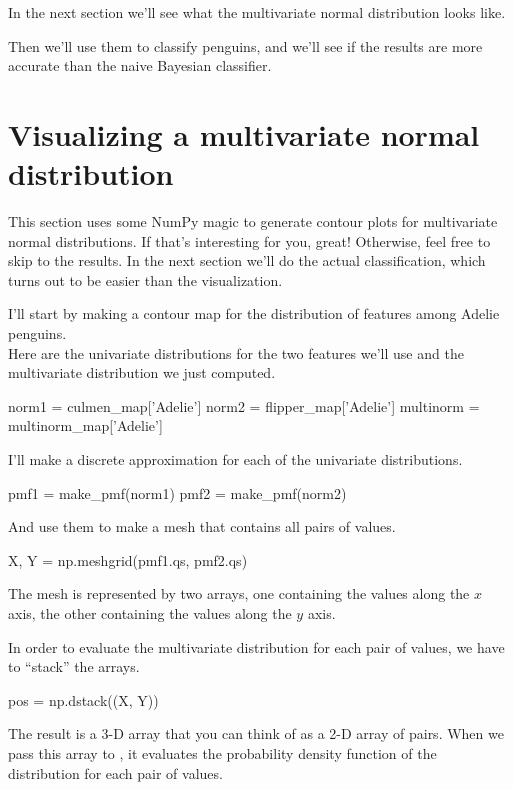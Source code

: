 \documentclass[12pt]{book}
\theoremstyle{exercise}
\begin{document}
In the next section we'll see what the multivariate normal distribution
looks like.

Then we'll use them to classify penguins, and we'll see if the results
are more accurate than the naive Bayesian classifier.


\section{Visualizing a multivariate normal distribution}
\label{visualizing-a-multivariate-normal-distribution}

This section uses some NumPy magic to generate contour plots for
multivariate normal distributions. If that's interesting for you, great!
Otherwise, feel free to skip to the results. In the next section we'll
do the actual classification, which turns out to be easier than the
visualization.

I'll start by making a contour map for the distribution of features
among Adelie penguins.\\
Here are the univariate distributions for the two features we'll use and
the multivariate distribution we just computed.

\begin{code}
norm1 = culmen_map['Adelie']
norm2 = flipper_map['Adelie']
multinorm = multinorm_map['Adelie']
\end{code}

I'll make a discrete  approximation for
each of the univariate distributions.

\begin{code}
pmf1 = make_pmf(norm1)
pmf2 = make_pmf(norm2)
\end{code}

And use them to make a mesh that contains all pairs of values.

\begin{code}
X, Y = np.meshgrid(pmf1.qs, pmf2.qs)
\end{code}

The mesh is represented by two arrays, one containing the values along
the $x$ axis, the other containing the values along the $y$ axis.

In order to evaluate the multivariate distribution for each pair of
values, we have to ``stack'' the arrays.

\begin{code}
pos = np.dstack((X, Y))
\end{code}

The result is a 3-D array that you can think of as a 2-D array of pairs.
When we pass this array to , it
evaluates the probability density function of the distribution for each
pair of values.
\end{document}
